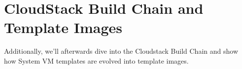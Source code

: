 \section{CloudStack Build Chain and Template Images}
Additionally, we'll afterwards dive into the Cloudstack Build Chain and show how System VM templates are evolved into template images.

